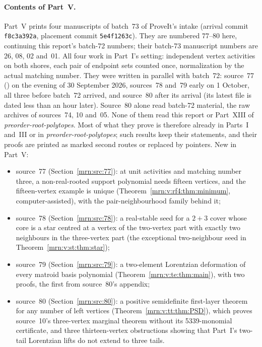 \documentclass[11pt,a4paper]{article}
\theoremstyle{remark}\newtheorem{remark}[theorem]{Remark}
\newcommand{\prp}{\emph{preorder-root-polytopes}}
\begin{document}
\paragraph{Contents of Part~V.}
Part~V prints four manuscripts of batch~73 of ProveIt's intake (arrival
commit \texttt{f8c3a392a}, placement commit \texttt{5e4f1263c}). They are
numbered 77--80 here, continuing this report's batch-72 numbers; their
batch-73 manuscript numbers are 26, 08, 02 and~01. All four work in Part~I's
setting: independent vertex activities on both shores, each pair of endpoint
sets counted once, normalization by the actual matching number. They were
written in parallel with batch~72: source~77
() on the evening of 30 September 2026,
sources~78 and~79 early on 1 October, all three before batch~72 arrived, and
source~80 after its arrival (its latest file is dated less than an hour
later). Source~80 alone read batch-72
material, the raw archives of sources~74, 10 and~05. None of them read this
report or Part~XIII of \prp. Most of what
they prove is therefore already in Parts~I and~III or in \prp; such results
keep their statements, and their proofs are printed as marked second routes
or replaced by pointers. New in Part~V:
\begin{itemize}
\item source~77 (Section~\ref{mrn:src:77}): at unit activities and matching
  number three, a non-real-rooted support polynomial needs fifteen vertices,
  and the fifteen-vertex example is unique
  (Theorem~\ref{mrn:v:rf4:thm:minimum}, computer-assisted), with the
  pair-neighbourhood family behind it;
\item source~78 (Section~\ref{mrn:src:78}): a real-stable seed for a
  $2+3$ cover whose core is a star centred at a vertex of the two-vertex
  part with exactly two neighbours in the three-vertex part (the exceptional
  two-neighbour seed in Theorem~\ref{mrn:v:st:thm:star});
\item source~79 (Section~\ref{mrn:src:79}): a two-element Lorentzian
  deformation of every matroid basis polynomial
  (Theorem~\ref{mrn:v:te:thm:main}), with two proofs, the first from
  source~80's appendix;
\item source~80 (Section~\ref{mrn:src:80}): a positive semidefinite
  first-layer theorem for any number of left vertices
  (Theorem~\ref{mrn:v:tt:thm:PSD}), which proves source~10's three-vertex
  marginal theorem without its 5339-monomial certificate, and three
  thirteen-vertex obstructions showing that Part~I's two-tail Lorentzian
  lifts do not extend to three tails.
\end{itemize}
\end{document}
